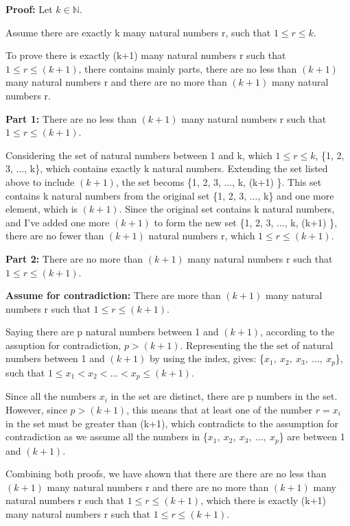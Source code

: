 \documentclass[12pt]{article}
\begin{document}
\textbf{Proof:} Let $k \in \mathbb{N}.$

\noindent Assume there are exactly k many natural numbers r, such that $1 \leq r \leq k$.

\noindent To prove there is exactly (k+1) many natural numbers r such that $1 \leq r \leq (k+1)$, there contains mainly parts, there are no less than $(k+1)$ many natural numbers r and there are no more than $(k+1)$ many natural numbers r.

\noindent \textbf{Part 1:} There are no less than $(k+1)$ many natural numbers r such that $1 \leq r \leq (k+1)$.

\noindent Considering the set of natural numbers between 1 and k, which $1 \leq r \leq k$, \{1, 2, 3, ..., k\}, which contains exactly k natural numbers.
Extending the set listed above to include $(k+1)$, the set becoms \{1, 2, 3, ..., k, (k+1) \}. This set contains k natural numbers from the original set \{1, 2, 3, ..., k\} and one more element, which is $(k+1)$.
Since the original set contains k natural numbers, and I've added one more $(k+1)$ to form the new set \{1, 2, 3, ..., k, (k+1) \}, there are no fewer than $(k+1)$ natural numbers r, which $1 \leq r \leq (k+1)$.

\noindent \textbf{Part 2:} There are no more than $(k+1)$ many natural numbers r such that $1 \leq r \leq (k+1)$.

\noindent \textbf{Assume for contradiction:} There are more than $(k+1)$ many natural numbers r such that $1 \leq r \leq (k+1)$.

\noindent Saying there are p natural numbers between 1 and $(k+1)$, according to the assuption for contradiction, $p > (k+1)$. 
Representing the the set of natural numbers between 1 and $(k+1)$ by using the index, gives: \{$x_1,\ x_2,\ x_3,\ ...,\ x_p$\}, such that $1 \leq x_1 < x_2 < ... < x_p \leq (k+1)$.

\noindent Since all the numbers $x_i$ in the set are distinct, there are p numbers in the set. However, since $p > (k+1)$, this means that at least one of the number $r=x_i$ in the set must be greater than (k+1), which contradicts to the assumption for contradiction as we assume all the numbers in \{$x_1,\ x_2,\ x_3,\ ...,\ x_p$\} are between 1 and $(k+1)$.

\noindent Combining both proofs, we have shown that there are there are no less than $(k+1)$ many natural numbers r and there are no more than $(k+1)$ many natural numbers r such that $1 \leq r \leq (k+1)$, which there is exactly (k+1) many natural numbers r such that $1 \leq r \leq (k+1)$.
\end{document}
